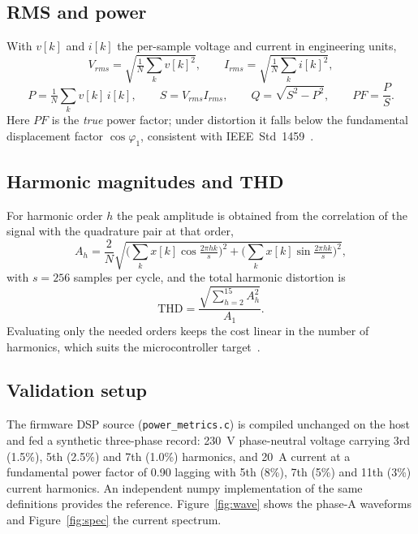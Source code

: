 \documentclass[11pt,a4paper]{article}
\begin{document}
\subsection{RMS and power}
With $v[k]$ and $i[k]$ the per-sample voltage and current in engineering units,
\begin{equation}
V_{rms}=\sqrt{\tfrac{1}{N}\textstyle\sum_{k} v[k]^2},\qquad
I_{rms}=\sqrt{\tfrac{1}{N}\textstyle\sum_{k} i[k]^2},
\end{equation}
\begin{equation}
P=\tfrac{1}{N}\sum_{k} v[k]\,i[k],\qquad S=V_{rms}I_{rms},\qquad
Q=\sqrt{S^2-P^2},\qquad PF=\frac{P}{S}.
\end{equation}
Here $PF$ is the \emph{true} power factor; under distortion it falls below the fundamental
displacement factor $\cos\varphi_1$, consistent with IEEE~Std~1459~\citep{ieee1459}.

\subsection{Harmonic magnitudes and THD}
For harmonic order $h$ the peak amplitude is obtained from the correlation of the signal with the
quadrature pair at that order,
\begin{equation}
A_h=\frac{2}{N}\sqrt{\Big(\sum_k x[k]\cos\tfrac{2\pi h k}{s}\Big)^2+
\Big(\sum_k x[k]\sin\tfrac{2\pi h k}{s}\Big)^2},
\end{equation}
with $s=256$ samples per cycle, and the total harmonic distortion is
\begin{equation}
\mathrm{THD}=\frac{\sqrt{\sum_{h=2}^{15} A_h^2}}{A_1}.
\end{equation}
Evaluating only the needed orders keeps the cost linear in the number of harmonics, which suits
the microcontroller target~\citep{goertzel1958}.

\subsection{Validation setup}
The firmware DSP source (\texttt{power\_metrics.c}) is compiled unchanged on the host and fed a
synthetic three-phase record: 230~V phase-neutral voltage carrying 3rd (1.5\%), 5th (2.5\%) and
7th (1.0\%) harmonics, and 20~A current at a fundamental power factor of 0.90 lagging with 5th
(8\%), 7th (5\%) and 11th (3\%) current harmonics. An independent numpy implementation of the
same definitions provides the reference. Figure~\ref{fig:wave} shows the phase-A waveforms and
Figure~\ref{fig:spec} the current spectrum.
\end{document}
